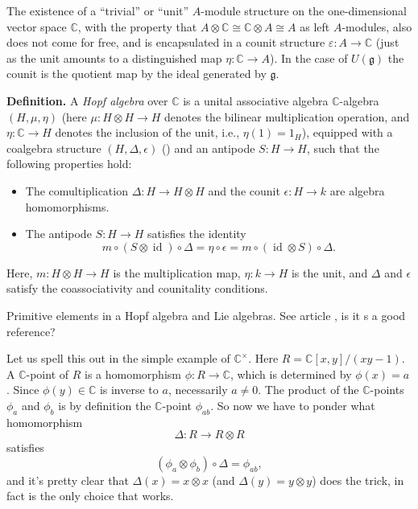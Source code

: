 \documentclass[12pt]{article}
\theoremstyle{plain}
\theoremstyle{definition}
\numberwithin{equation}{section}
\newcommand{\D}{\Delta}
\newcommand{\C}{\mathbb{C}}
\newcommand{\g}{\mathfrak{g}}
\begin{document}
{The existence of a ``trivial'' or ``unit'' $A$-module structure on the one-dimensional vector space $\C$, with the property that $A \otimes \C \cong \C \otimes A \cong A$ as left $A$-modules, also does not come for free, and is encapsulated in a counit structure $\varepsilon : A \rightarrow \C$ (just as the unit amounts to a distinguished map $\eta : \C \rightarrow A$). In the case of $U(\g)$ the counit is the quotient map by the ideal generated by $\g$.



\textbf{Definition.} A \emph{Hopf algebra} over $\C$ is a unital associative algebra $\C$-algebra $(H, \mu, \eta)$ (here $\mu : H \otimes H \rightarrow H$ denotes the bilinear multiplication operation, and $\eta : \C \rightarrow H$ denotes the inclusion of the unit, i.e., $\eta(1) = 1_H$), equipped with a coalgebra structure $(H, \Delta, \epsilon)$ () and an antipode $S: H \to H$, such that the following properties hold:

\begin{itemize}
    \item The comultiplication $\Delta: H \to H \otimes H$ and the counit $\epsilon: H \to k$ are algebra homomorphisms.
    \item The antipode $S: H \to H$ satisfies the identity
    \[
    m \circ (S \otimes \operatorname{id}) \circ \Delta = \eta \circ \epsilon = m \circ (\operatorname{id} \otimes S) \circ \Delta.
    \]
\end{itemize}

Here, $m: H \otimes H \to H$ is the multiplication map, $\eta: k \to H$ is the unit, and $\Delta$ and $\epsilon$ satisfy the coassociativity and counitality conditions.




Primitive elements in a Hopf algebra and Lie algebras. See article \cite{Reinoehl}, is it s a good reference?





}

Let us spell this out in the simple example of $\C^\times$. Here $R = \C[x, y] / (xy-1)$. A $\C$-point of $R$ is a homomorphism $\phi : R \rightarrow \C$, which is determined by $\phi(x) = a$. Since $\phi(y) \in \C$ is inverse to $a$, necessarily $a \neq 0$. The product of the $\C$-points $\phi_a$ and $\phi_b$ is by definition the $\C$-point $\phi_{ab}$. So now we have to ponder what homomorphism
\[
\Delta : R \rightarrow R \otimes R
\]
satisfies
\[
(\phi_a \otimes \phi_b) \circ \Delta = \phi_{ab},
\]
and it's pretty clear that $\D(x) = x \otimes x$ (and $\D(y) = y \otimes y$) does the trick, in fact is the only choice that works.
\end{document}
